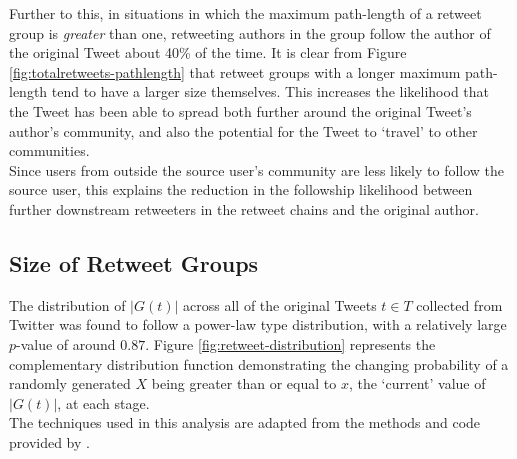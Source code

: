 Further to this, in situations in which the maximum path-length of a retweet group is \textit{greater} than one, retweeting authors in the group follow the author of the original Tweet about 40\% of the time. It is clear from Figure \ref{fig:totalretweets-pathlength} that retweet groups with a longer maximum path-length tend to have a larger size themselves. This increases the likelihood that the Tweet has been able to spread both further around the original Tweet's author's community, and also the potential for the Tweet to `travel' to other communities.\\
Since users from outside the source user's community are less likely to follow the source user, this explains the reduction in the followship likelihood between further downstream retweeters in the retweet chains and the original author.


\subsection{Size of Retweet Groups}
The distribution of $|G(t)|$ across all of the original Tweets $t \in T$ collected from Twitter was found to follow a power-law type distribution, with a relatively large $p$-value of around $0.87$. Figure \ref{fig:retweet-distribution} represents the complementary distribution function demonstrating the changing probability of a randomly generated $X$ being greater than or equal to $x$, the `current' value of $|G(t)|$, at each stage.\\
The techniques used in this analysis are adapted from the methods and code provided by \cite{clauset07}.

